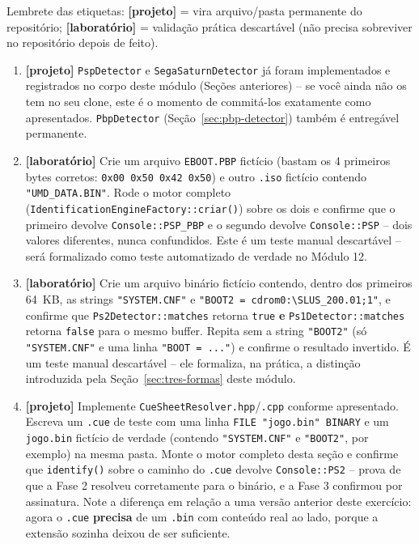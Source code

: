 \begin{CaixaDesafio}
Lembrete das etiquetas: \textbf{[projeto]} = vira arquivo/pasta permanente do repositório; \textbf{[laboratório]} = validação prática descartável (não precisa sobreviver no repositório depois de feito).

\begin{enumerate}[label=\textbf{2.\arabic*}]
    \item \textbf{[projeto]} \texttt{PspDetector} e \texttt{SegaSaturnDetector} já foram implementados e registrados no corpo deste módulo (Seções anteriores) -- se você ainda não os tem no seu clone, este é o momento de commitá-los exatamente como apresentados. \texttt{PbpDetector} (Seção~\ref{sec:pbp-detector}) também é entregável permanente.
    \item \textbf{[laboratório]} Crie um arquivo \texttt{EBOOT.PBP} fictício (bastam os 4 primeiros bytes corretos: \texttt{0x00 0x50 0x42 0x50}) e outro \texttt{.iso} fictício contendo \texttt{"UMD\_DATA.BIN"}. Rode o motor completo (\texttt{IdentificationEngineFactory::criar()}) sobre os dois e confirme que o primeiro devolve \texttt{Console::PSP\_PBP} e o segundo devolve \texttt{Console::PSP} -- dois valores diferentes, nunca confundidos. Este é um teste manual descartável -- será formalizado como teste automatizado de verdade no Módulo 12.
    \item \textbf{[laboratório]} Crie um arquivo binário fictício contendo, dentro dos primeiros 64~KB, as strings \texttt{"SYSTEM.CNF"} e \texttt{"BOOT2 = cdrom0:\textbackslash SLUS\_200.01;1"}, e confirme que \texttt{Ps2Detector::matches} retorna \texttt{true} \textbf{e} \texttt{Ps1Detector::matches} retorna \texttt{false} para o mesmo buffer. Repita sem a string \texttt{"BOOT2"} (só \texttt{"SYSTEM.CNF"} e uma linha \texttt{"BOOT = ..."}) e confirme o resultado invertido. É um teste manual descartável -- ele formaliza, na prática, a distinção introduzida pela Seção~\ref{sec:tres-formas} deste módulo.
    \item \textbf{[projeto]} Implemente \texttt{CueSheetResolver.hpp}/\texttt{.cpp} conforme apresentado. Escreva um \texttt{.cue} de teste com uma linha \texttt{FILE "jogo.bin" BINARY} e um \texttt{jogo.bin} fictício de verdade (contendo \texttt{"SYSTEM.CNF"} e \texttt{"BOOT2"}, por exemplo) na mesma pasta. Monte o motor completo desta seção e confirme que \texttt{identify()} sobre o caminho do \texttt{.cue} devolve \texttt{Console::PS2} -- prova de que a Fase 2 resolveu corretamente para o binário, e a Fase 3 confirmou por assinatura. Note a diferença em relação a uma versão anterior deste exercício: agora o \texttt{.cue} \textbf{precisa} de um \texttt{.bin} com conteúdo real ao lado, porque a extensão sozinha deixou de ser suficiente.

\end{enumerate}
\end{CaixaDesafio}
